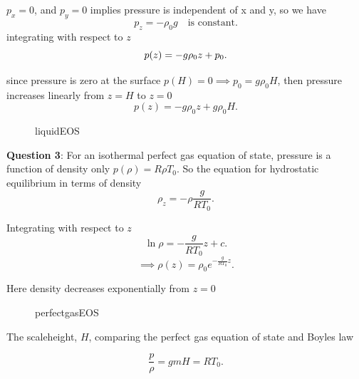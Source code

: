 $p_{x}=0 $, and $p_{y}=0$ implies pressure is independent of x and y, so we
have
\[
  p_{z}= - \rho_0g \quad \text{is constant}
.\] 
integrating with respect to $z$ 
\[
  p(z) = -g \rho_0z + p_0 \\
.\] 

since pressure is zero at the surface $p(H) =0\implies p_0= g \rho_0H$, then
pressure increases linearly from $z=H$ to $z=0$
\[
\boxed{p(z) = -g \rho_0z +g \rho_0H}  
.\] 

\begin{figure}[H]
    \centering
    \caption{liquidEOS}
    \label{fig:pressure1}
\end{figure}

\textbf{Question 3}: For an isothermal perfect gas equation of state, pressure
is a function of density only $p( \rho) = R \rho T_0$. So the equation for hydrostatic equilibrium in terms of
density
\[
\rho_{z} = -\rho \frac{g}{RT_0}
.\] 

Integrating with respect to $z$ 
\[
  \ln{ \rho} = - \frac{g}{RT_0}z + c
.\] 
\[
  \implies \boxed{ \rho(z) = \rho_0e^{- \frac{g}{RT_0}z}}
.\] 

Here density decreases exponentially from $z=0$

\begin{figure}[H]
    \centering
    \caption{perfectgasEOS}
    \label{fig:perfectgaseos}
\end{figure}

The scaleheight, $H$, comparing the perfect gas equation of state and Boyles
law

\[
\frac{p}{ \rho} = gmH = RT_0
.\] 





